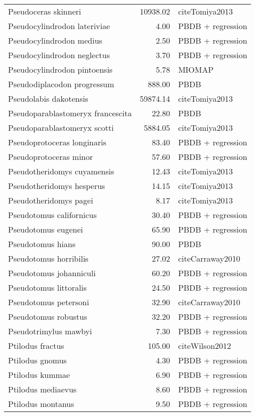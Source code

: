 \begin{table}[ht]
\begin{tabular}{lrl}
  Pseudoceras skinneri & 10938.02 & cite{Tomiya2013} \\ 
  Pseudocylindrodon lateriviae & 4.00 & PBDB + regression \\ 
  Pseudocylindrodon medius & 2.50 & PBDB + regression \\ 
  Pseudocylindrodon neglectus & 3.70 & PBDB + regression \\ 
  Pseudocylindrodon pintoensis & 5.78 & MIOMAP \\ 
  Pseudodiplacodon progressum & 888.00 & PBDB \\ 
  Pseudolabis dakotensis & 59874.14 & cite{Tomiya2013} \\ 
  Pseudoparablastomeryx francescita & 22.80 & PBDB \\ 
  Pseudoparablastomeryx scotti & 5884.05 & cite{Tomiya2013} \\ 
  Pseudoprotoceras longinaris & 83.40 & PBDB + regression \\ 
  Pseudoprotoceras minor & 57.60 & PBDB + regression \\ 
  Pseudotheridomys cuyamensis & 12.43 & cite{Tomiya2013} \\ 
  Pseudotheridomys hesperus & 14.15 & cite{Tomiya2013} \\ 
  Pseudotheridomys pagei & 8.17 & cite{Tomiya2013} \\ 
  Pseudotomus californicus & 30.40 & PBDB + regression \\ 
  Pseudotomus eugenei & 65.90 & PBDB + regression \\ 
  Pseudotomus hians & 90.00 & PBDB \\ 
  Pseudotomus horribilis & 27.02 & cite{Carraway2010} \\ 
  Pseudotomus johanniculi & 60.20 & PBDB + regression \\ 
  Pseudotomus littoralis & 24.50 & PBDB + regression \\ 
  Pseudotomus petersoni & 32.90 & cite{Carraway2010} \\ 
  Pseudotomus robustus & 32.20 & PBDB + regression \\ 
  Pseudotrimylus mawbyi & 7.30 & PBDB + regression \\ 
  Ptilodus fractus & 105.00 & cite{Wilson2012} \\ 
  Ptilodus gnomus & 4.30 & PBDB + regression \\ 
  Ptilodus kummae & 6.90 & PBDB + regression \\ 
  Ptilodus mediaevus & 8.60 & PBDB + regression \\ 
  Ptilodus montanus & 9.50 & PBDB + regression \\ 

\end{tabular}
\end{table}
